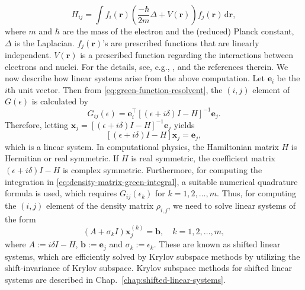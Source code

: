 \[H_{ij}=\int f_i(\boldsymbol{r})\left(\frac{-\hbar}{2m}\Delta+V(\boldsymbol{r})\right)f_j(\boldsymbol{r})\,\mathrm d\boldsymbol{r},\]
{where $m$ and $\hbar$ are the mass of the electron and the (reduced) Planck constant, $\Delta$ is the Laplacian. $f_j(\boldsymbol{r})$'s are prescribed functions that are linearly independent. $V(\boldsymbol{r})$ is a prescribed function regarding the interactions between electrons and nuclei. For the details, see, e.g., ,  and the references therein.}
{We now describe how linear systems arise from the above computation. Let $\boldsymbol{e}_i$ be the $i$th unit vector. Then from \eqref{eq:green-function-resolvent}, the $(i,j)$ element of $G(\epsilon)$ is calculated by}
\[G_{ij}(\epsilon)=\boldsymbol{e}_i^{\top}[(\epsilon+i\delta)I-H]^{-1}\boldsymbol{e}_j.\]
{Therefore, letting $\boldsymbol{x}_j=[(\epsilon+i\delta)I-H]^{-1}\boldsymbol{e}_j$ yields}
\[[(\epsilon+i\delta)I-H]\boldsymbol{x}_j=\boldsymbol{e}_j,\]
{which is a linear system. In computational physics, the Hamiltonian matrix $H$ is Hermitian or real symmetric. If $H$ is real symmetric, the coefficient matrix $(\epsilon+i\delta)I-H$ is complex symmetric. Furthermore, for computing the integration in \eqref{eq:density-matrix-green-integral}, a suitable numerical quadrature formula is used, which requires $G_{ij}(\epsilon_k)$ for $k=1,2,\ldots,m$. Thus, for computing the $(i,j)$ element of the density matrix $\rho_{i,j}$, we need to solve linear systems of the form}
\[(A+\sigma_kI)\boldsymbol{x}_j^{(k)}=\boldsymbol{b},\quad k=1,2,\ldots,m,\]
{where $A:=i\delta I-H$, $\boldsymbol{b}:=\boldsymbol{e}_j$ and $\sigma_k:=\epsilon_k$. These are known as shifted linear systems, which are efficiently solved by Krylov subspace methods by utilizing the shift-invariance of Krylov subspace. Krylov subspace methods for shifted linear systems are described in Chap.\ \ref{chap:shifted-linear-systems}.}
